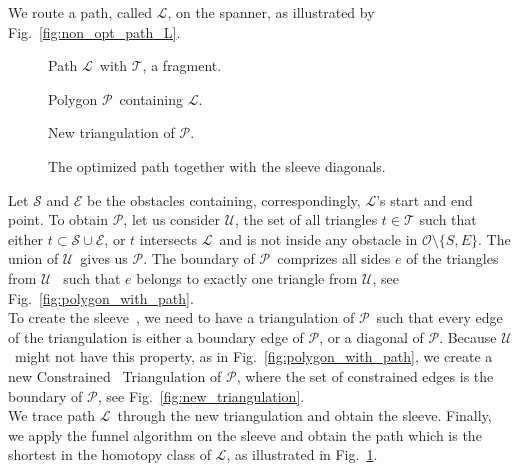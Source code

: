 \documentclass{gd-llncs}
\newcommand{\cdt}{$\mathcal{T}$}
\newcommand{\unpath}{$\mathcal{L}$}
\newcommand{\triset}{$\mathcal{U}$}
\newcommand{\plg}{$\mathcal{P}$}
\begin{document}
{We route a path, called \unpath, on the spanner, as illustrated by Fig.~\ref{fig:non_opt_path_L}.
\begin{figure}[!tbp]
  \centering
  \begin{minipage}[b]{0.45\textwidth}
    
    \caption{Path \unpath~with \cdt, a fragment.}
    \label{fig:non_opt_path_L}
  \end{minipage}
  \hfill
  \begin{minipage}[b]{0.45\textwidth}
    
    \caption{Polygon \plg~containing \unpath.}
    \label{fig:polygon_with_path}
  \end{minipage}
  \vfill
  \begin{minipage}[b]{0.45\textwidth}
    
    \caption{New triangulation of \plg.}
    \label{fig:new_triangulation}
  \end{minipage}
  \hfill
  \begin{minipage}[b]{0.45\textwidth}
    
    \caption{The optimized path together with the sleeve diagonals.}
    \label{fig:optimized_path}
  \end{minipage}
\end{figure}
Let $\mathcal{S}$ and $\mathcal{E}$ be the obstacles containing, correspondingly, \unpath's start and end point.
To obtain \plg, let us consider \triset, the set of all triangles ${t} \in \mathcal{T}$ such that
either ${t} \subset \mathcal{S} \cup \mathcal{E}$, or $t$ intersects \unpath~and is not inside any obstacle in $\mathcal{O} \setminus \{S,E\}$.
The union of \triset~gives us \plg. The boundary of \plg~comprizes all sides $e$ of the triangles from \triset~ such that $e$ belongs to exactly one triangle from \triset, see Fig.~\ref{fig:polygon_with_path}. \\
To create the sleeve~\cite{chazelle1982theorem,hershberger1994computing}, we need to have a triangulation of \plg~such that every edge of the triangulation is either a boundary edge of \plg, or a diagonal of \plg. Because \triset~might not have this property, as in Fig.~\ref{fig:polygon_with_path}, we create a new Constrained \ Triangulation of \plg, where the set of constrained edges is the boundary of \plg, see Fig.~\ref{fig:new_triangulation}.\\
We trace path \unpath~through the new triangulation and obtain the sleeve. Finally, we apply the funnel algorithm on the sleeve and obtain the path which is the shortest in the homotopy class of \unpath, as illustrated in Fig.~\ref{fig:optimized_path}.\\
}
\end{document}
